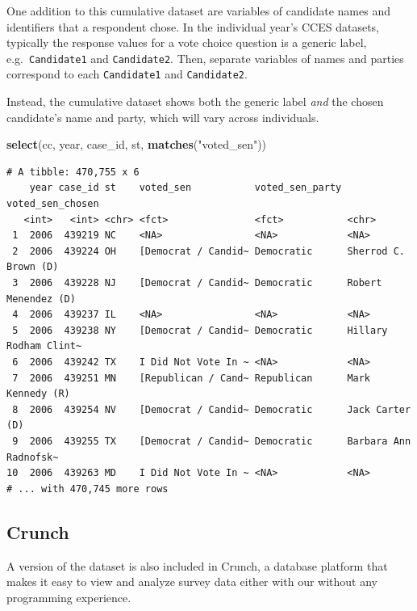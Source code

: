 \documentclass[10pt,article,oneside]{memoir}
\theoremstyle{definition}
\newenvironment{Shaded}{\begin{snugshade}}{\end{snugshade}}
\newcommand{\KeywordTok}[1]{\textcolor[rgb]{0.13,0.29,0.53}{\textbf{#1}}}
\newcommand{\NormalTok}[1]{#1}
\newcommand{\StringTok}[1]{\textcolor[rgb]{0.31,0.60,0.02}{#1}}
\begin{document}
One addition to this cumulative dataset are variables of candidate names
and identifiers that a respondent chose. In the individual year's CCES
datasets, typically the response values for a vote choice question is a
generic label, e.g.~\texttt{Candidate1} and \texttt{Candidate2}. Then,
separate variables of names and parties correspond to each
\texttt{Candidate1} and \texttt{Candidate2}.

Instead, the cumulative dataset shows both the generic label \emph{and}
the chosen candidate's name and party, which will vary across
individuals.

\begin{Shaded}
\begin{Highlighting}[]
\KeywordTok{select}\NormalTok{(cc, year, case\_id, st, }\KeywordTok{matches}\NormalTok{(}\StringTok{"voted\_sen"}\NormalTok{))}
\end{Highlighting}
\end{Shaded}

\begin{verbatim}
# A tibble: 470,755 x 6
    year case_id st    voted_sen           voted_sen_party voted_sen_chosen     
   <int>   <int> <chr> <fct>               <fct>           <chr>                
 1  2006  439219 NC    <NA>                <NA>            <NA>                 
 2  2006  439224 OH    [Democrat / Candid~ Democratic      Sherrod C. Brown (D) 
 3  2006  439228 NJ    [Democrat / Candid~ Democratic      Robert Menendez (D)  
 4  2006  439237 IL    <NA>                <NA>            <NA>                 
 5  2006  439238 NY    [Democrat / Candid~ Democratic      Hillary Rodham Clint~
 6  2006  439242 TX    I Did Not Vote In ~ <NA>            <NA>                 
 7  2006  439251 MN    [Republican / Cand~ Republican      Mark Kennedy (R)     
 8  2006  439254 NV    [Democrat / Candid~ Democratic      Jack Carter (D)      
 9  2006  439255 TX    [Democrat / Candid~ Democratic      Barbara Ann Radnofsk~
10  2006  439263 MD    I Did Not Vote In ~ <NA>            <NA>                 
# ... with 470,745 more rows
\end{verbatim}

\hypertarget{crunch}{%
\subsection{Crunch}\label{crunch}}

A version of the dataset is also included in Crunch, a database platform
that makes it easy to view and analyze survey data either with our
without any programming experience.
\end{document}
